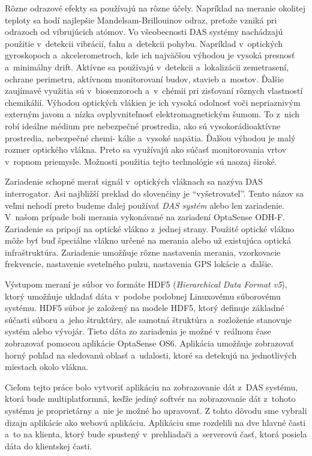 Rôzne odrazové efekty sa používajú na rôzne účely. Napríklad na meranie okolitej teploty sa hodí najlepšie Mandelsam-Brillouinov odraz, pretože vzniká pri odrazoch od vibrujúcich atómov. Vo všeobecnosti DAS systémy nachádzajú použitie v~detekcii vibrácií, ťahu a~detekcii pohybu. Napríklad v~optických gyroskopoch a~akcelerometroch, kde ich najväčšou výhodou je vysoká presnosť a~minimálny drift. Aktívne sa používajú v~detekcii a~lokalizácii zemetrasení, ochrane perimetru, aktívnom monitorovaní budov, stavieb a~mostov. Ďalšie zaujímavé využitia sú v~biosenzoroch a~v~chémii pri zisťovaní rôznych vlastností chemikálií. Výhodou optických vlákien je ich vysoká odolnosť voči nepriaznivým externým javom a~nízka ovplyvniteľnosť elektromagnetickým šumom. To z~nich robí ideálne médium pre nebezpečné prostredia, ako sú vysokorádioaktívne prostredia, nebezpečné chemi- kálie a~vysoké napätia. Ďalšou výhodou je malý rozmer optického vlákna. Preto sa využívajú ako súčasť monitorovania vrtov v~ropnom priemysle. Možnosti použitia tejto technológie sú naozaj široké.

Zariadenie schopné merať signál v~optických vláknach sa nazýva DAS interrogator. Asi najbližší preklad do slovenčiny je ``vyšetrovateľ''. Tento názov sa veľmi nehodí preto budeme ďalej používať \textit{DAS systém} alebo len zariadenie. V~našom prípade boli merania vykonávané na zariadení OptaSense ODH-F. Zariadenie sa pripojí na optické vlákno z~jednej strany. Použité optické vlákno môže byť buď špeciálne vlákno určené na merania alebo už existujúca optická infraštruktúra. Zariadenie umožňuje rôzne nastavenia merania, vzorkovacie frekvencie, nastavenie svetelného pulzu, nastavenia GPS lokácie a~ďalšie. 

Výstupom meraní je súbor vo formáte HDF5 (\textit{Hierarchical Data Format v5}), ktorý umožňuje ukladať dáta v~podobe podobnej Linuxovému súborovému systému. HDF5 súbor je založený na modele HDF5, ktorý definuje základné súčasti súboru a~jeho štruktúry, ale samotná štruktúra a~rozloženie stanovuje systém alebo vývojár. Tieto dáta zo zariadenia je možné v~reálnom čase zobrazovať pomocou aplikácie OptaSense OS6. Aplikácia umožňuje zobrazovať horný pohľad na sledovanú oblasť a~udalosti, ktoré sa detekujú na jednotlivých miestach okolo vlákna.

Cieľom tejto práce bolo vytvoriť aplikáciu na zobrazovanie dát z~DAS systému, ktorá bude multiplatformná, keďže jediný softvér na zobrazovanie dát z~tohoto systému je proprietárny a~nie je možné ho upravovať. Z tohto dôvodu sme vybrali dizajn aplikácie ako webovú aplikáciu. Aplikáciu sme rozdelili na dve hlavné časti a~to na klienta, ktorý bude spustený v~prehliadači a~serverovú časť, ktorá posiela dáta do klientskej časti.

